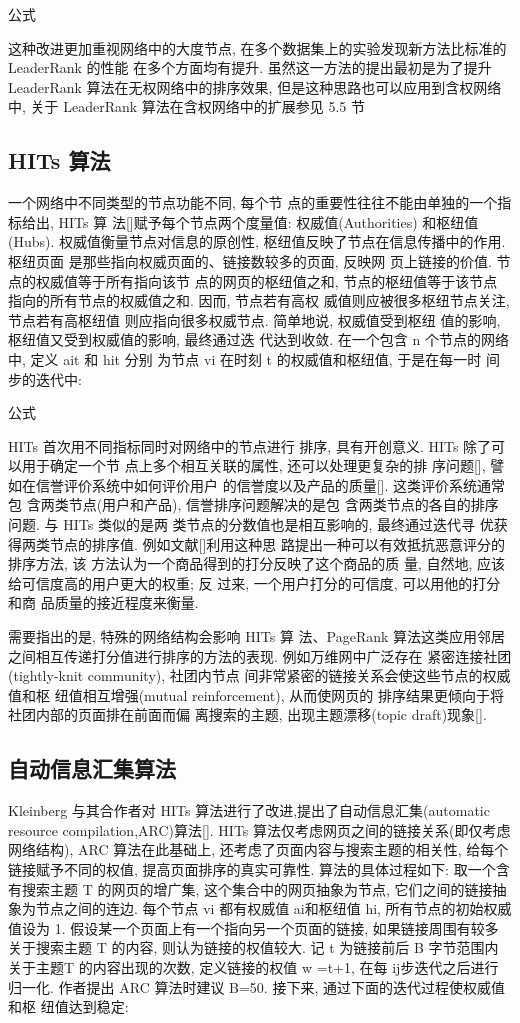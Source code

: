 			公式

			这种改进更加重视网络中的大度节点, 在多个数据集上的实验发现新方法比标准的 LeaderRank 的性能 在多个方面均有提升. 虽然这一方法的提出最初是为了提升 LeaderRank 算法在无权网络中的排序效果, 但是这种思路也可以应用到含权网络中, 关于 LeaderRank 算法在含权网络中的扩展参见 5.5 节
\subsection{HITs 算法}
一个网络中不同类型的节点功能不同, 每个节 点的重要性往往不能由单独的一个指标给出, HITs 算 法[]赋予每个节点两个度量值: 权威值(Authorities) 和枢纽值(Hubs). 权威值衡量节点对信息的原创性, 枢纽值反映了节点在信息传播中的作用. 枢纽页面 是那些指向权威页面的、链接数较多的页面, 反映网 页上链接的价值. 节点的权威值等于所有指向该节 点的网页的枢纽值之和, 节点的枢纽值等于该节点 指向的所有节点的权威值之和. 因而, 节点若有高权 威值则应被很多枢纽节点关注, 节点若有高枢纽值 则应指向很多权威节点. 简单地说, 权威值受到枢纽 值的影响, 枢纽值又受到权威值的影响, 最终通过迭 代达到收敛.
			在一个包含 n 个节点的网络中, 定义 ait 和 hit 分别 为节点 vi 在时刻 t 的权威值和枢纽值, 于是在每一时 间步的迭代中:

			公式

			HITs 首次用不同指标同时对网络中的节点进行 排序, 具有开创意义. HITs 除了可以用于确定一个节 点上多个相互关联的属性, 还可以处理更复杂的排 序问题[], 譬如在信誉评价系统中如何评价用户 的信誉度以及产品的质量[]. 这类评价系统通常包 含两类节点(用户和产品), 信誉排序问题解决的是包 含两类节点的各自的排序问题. 与 HITs 类似的是两 类节点的分数值也是相互影响的, 最终通过迭代寻 优获得两类节点的排序值. 例如文献[]利用这种思 路提出一种可以有效抵抗恶意评分的排序方法, 该 方法认为一个商品得到的打分反映了这个商品的质 量, 自然地, 应该给可信度高的用户更大的权重; 反 过来, 一个用户打分的可信度, 可以用他的打分和商 品质量的接近程度来衡量.

			需要指出的是, 特殊的网络结构会影响 HITs 算 法、PageRank 算法这类应用邻居之间相互传递打分值进行排序的方法的表现. 例如万维网中广泛存在 紧密连接社团(tightly-knit community), 社团内节点 间非常紧密的链接关系会使这些节点的权威值和枢 纽值相互增强(mutual reinforcement), 从而使网页的 排序结果更倾向于将社团内部的页面排在前面而偏 离搜索的主题, 出现主题漂移(topic draft)现象[].

\subsection{自动信息汇集算法}
Kleinberg 与其合作者对 HITs 算法进行了改进,提出了自动信息汇集(automatic resource compilation,ARC)算法[]. HITs 算法仅考虑网页之间的链接关系(即仅考虑网络结构), ARC 算法在此基础上, 还考虑了页面内容与搜索主题的相关性, 给每个链接赋予不同的权值, 提高页面排序的真实可靠性. 算法的具体过程如下: 取一个含有搜索主题 T 的网页的增广集, 这个集合中的网页抽象为节点, 它们之间的链接抽象为节点之间的连边. 每个节点 vi 都有权威值 ai和枢纽值 hi, 所有节点的初始权威值设为 1. 假设某一个页面上有一个指向另一个页面的链接, 如果链接周围有较多关于搜索主题 T 的内容, 则认为链接的权值较大. 记 t 为链接前后 B 字节范围内关于主题T 的内容出现的次数, 定义链接的权值 w =t+1, 在每 ij步迭代之后进行归一化. 作者提出 ARC 算法时建议 B=50. 接下来, 通过下面的迭代过程使权威值和枢 纽值达到稳定:

